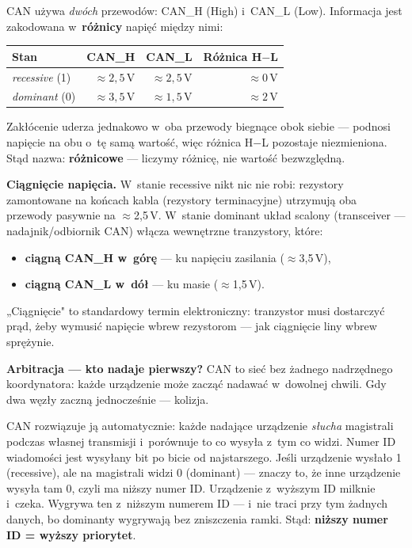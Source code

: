 \documentclass[12pt,a4paper]{article}
\begin{document}
CAN używa \emph{dwóch} przewodów: CAN\_H (High) i~CAN\_L (Low).
Informacja jest zakodowana w~\textbf{różnicy} napięć między nimi:

\begin{center}
\begin{tabular}{lrrr}
\toprule
\textbf{Stan} & CAN\_H & CAN\_L & Różnica H$-$L \\
\midrule
\textit{recessive} (1) & $\approx 2{,}5$\,V & $\approx 2{,}5$\,V & $\approx 0$\,V \\
\textit{dominant}  (0) & $\approx 3{,}5$\,V & $\approx 1{,}5$\,V & $\approx 2$\,V \\
\bottomrule
\end{tabular}
\end{center}

Zakłócenie uderza jednakowo w~oba przewody biegnące obok siebie — podnosi
napięcie na obu o~tę samą wartość, więc różnica H$-$L pozostaje niezmieniona.
Stąd nazwa: \textbf{różnicowe} — liczymy różnicę, nie wartość bezwzględną.

\medskip
\textbf{Ciągnięcie napięcia.}
W~stanie recessive nikt nic nie robi: rezystory zamontowane na końcach kabla
(rezystory terminacyjne) utrzymują oba przewody pasywnie na $\approx$2,5\,V.
W~stanie dominant układ scalony (transceiver — nadajnik/odbiornik CAN)
włącza wewnętrzne tranzystory, które:
\begin{itemize}
    \item \textbf{ciągną CAN\_H w~górę} — ku napięciu zasilania ($\approx$3,5\,V),
    \item \textbf{ciągną CAN\_L w~dół} — ku masie ($\approx$1,5\,V).
\end{itemize}
„Ciągnięcie" to standardowy termin elektroniczny: tranzystor musi dostarczyć
prąd, żeby wymusić napięcie wbrew rezystorom — jak ciągnięcie liny wbrew
sprężynie.

\medskip
\textbf{Arbitracja — kto nadaje pierwszy?}
CAN to sieć bez żadnego nadrzędnego koordynatora: każde urządzenie może zacząć
nadawać w~dowolnej chwili. Gdy dwa węzły zaczną jednocześnie — kolizja.

CAN rozwiązuje ją automatycznie: każde nadające urządzenie \emph{słucha}
magistrali podczas własnej transmisji i~porównuje to co wysyła z~tym co widzi.
Numer ID wiadomości jest wysyłany bit po bicie od najstarszego.
Jeśli urządzenie wysłało 1 (recessive), ale na magistrali widzi 0 (dominant) —
znaczy to, że inne urządzenie wysyła tam 0, czyli ma niższy numer ID.
Urządzenie z~wyższym ID milknie i~czeka. Wygrywa ten z~niższym numerem ID
— i~nie traci przy tym żadnych danych, bo dominanty wygrywają bez zniszczenia
ramki. Stąd: \textbf{niższy numer ID = wyższy priorytet}.
\end{document}
